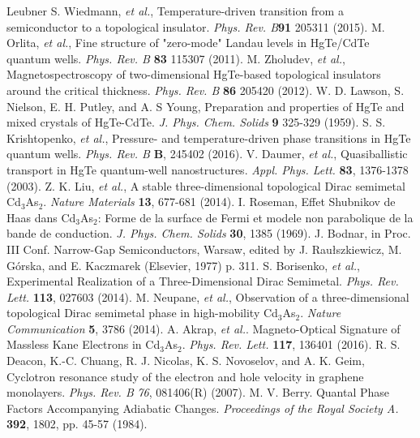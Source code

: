 \documentclass[titlepage,a4paper]{book}
\begin{document}
\begin{thebibliography}{99}
Leubner
S. Wiedmann, \textit{et al.}, Temperature-driven transition from a semiconductor to a topological insulator. \textit{Phys. Rev. B}\textbf{91} 205311 (2015).
M. Orlita, \textit{et al.}, Fine structure of "zero-mode" Landau levels in HgTe/CdTe quantum wells. \textit{Phys. Rev. B} \textbf{83} 115307 (2011).
M. Zholudev, \textit{et al.}, Magnetospectroscopy of two-dimensional HgTe-based topological insulators around the critical thickness. \textit{Phys. Rev. B} \textbf{86} 205420 (2012).
W. D. Lawson, S. Nielson, E. H. Putley, and A. S Young, Preparation and properties of HgTe and mixed crystals of HgTe-CdTe. \textit{J. Phys. Chem. Solids} \textbf{9} 325-329 (1959).
S. S. Krishtopenko, \textit{et al.}, Pressure- and temperature-driven phase transitions in HgTe quantum wells. \textit{Phys. Rev. B} \textbf{B}, 245402 (2016).
V. Daumer, \textit{et al.}, Quasiballistic transport in HgTe quantum-well nanostructures. \textit{Appl. Phys. Lett.} \textbf{83}, 1376-1378 (2003).
Z. K. Liu, \textit{et al.}, A stable three-dimensional topological Dirac semimetal Cd$_3$As$_2$. \textit{Nature Materials} \textbf{13}, 677-681 (2014).  
I. Roseman, Effet Shubnikov de Haas dans Cd$_3$As$_2$: Forme de la surface de Fermi et modele non parabolique de la bande de conduction. \textit{J. Phys. Chem. Solids} \textbf{30}, 1385 (1969).
J. Bodnar, in Proc. III Conf. Narrow-Gap Semiconductors, Warsaw, edited by J. Raułszkiewicz, M. Górska, and E. Kaczmarek (Elsevier, 1977) p. 311.
S. Borisenko, \textit{et al.}, Experimental Realization of a Three-Dimensional Dirac Semimetal. \textit{Phys. Rev. Lett.} \textbf{113}, 027603 (2014).
M. Neupane, \textit{et al.}, Observation of a three-dimensional topological Dirac semimetal phase in high-mobility Cd$_3$As$_2$. \textit{Nature Communication} \textbf{5}, 3786 (2014).
A. Akrap, \textit{et al.}. Magneto-Optical Signature of Massless Kane Electrons in Cd$_3$As$_2$. \textit{Phys. Rev. Lett.} \textbf{117}, 136401 (2016). 
R. S. Deacon, K.-C. Chuang, R. J. Nicolas, K. S. Novoselov, and A. K. Geim, Cyclotron resonance study of the electron and hole velocity in graphene monolayers. \textit{Phys. Rev. B} \textit{76}, 081406(R) (2007).
M. V. Berry. Quantal Phase Factors Accompanying Adiabatic Changes. \textit{Proceedings of the Royal Society A.} \textbf{392}, 1802, pp. 45-57 (1984).

\end{thebibliography}
\end{document}
